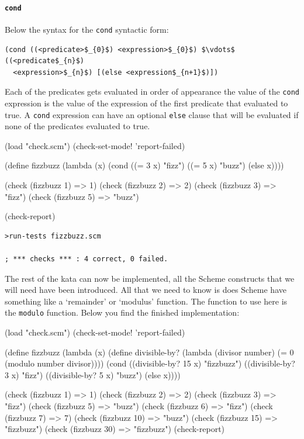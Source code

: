 \documentclass[12pt,a4paper,english,twoside]{article}
\begin{document}
\paragraph{\texttt{cond}}
Below the syntax for the \texttt{cond} syntactic form:
\begin{lstlisting}[mathescape]
  (cond ((<predicate>$_{0}$) <expression>$_{0}$) $\vdots$ ((<predicate$_{n}$) 
  <expression>$_{n}$) [(else <expression$_{n+1}$)])
\end{lstlisting}
Each of the predicates gets evaluated in order of appearance the value of the 
\texttt{cond} expression is the value of the expression of the first predicate 
that evaluated to true. A \texttt{cond} expression can have an optional 
\texttt{else} clause that will be evaluated if none of the predicates 
evaluated to true.
\begin{schemecode}
(load "check.scm")
(check-set-mode! 'report-failed)

(define fizzbuzz (lambda (x) (cond ((= 3 x) "fizz")
          ((= 5 x) "buzz")
          (else x))))

(check (fizzbuzz 1) => 1)
(check (fizzbuzz 2) => 2)
(check (fizzbuzz 3) => "fizz")
(check (fizzbuzz 5) => "buzz")

(check-report)
\end{schemecode}
\begin{lstlisting}
>run-tests fizzbuzz.scm

; *** checks *** : 4 correct, 0 failed.  \end{lstlisting}
The rest of the kata can now be implemented, all the Scheme constructs that we 
will need have been introduced. All that we need to know is does Scheme have 
something like a `remainder' or `modulus' function. The function to use here 
is the \texttt{modulo} function. Below you find the finished implementation:
\begin{schemecode}
(load "check.scm")
(check-set-mode! 'report-failed)

(define fizzbuzz (lambda (x) (define divisible-by?  (lambda (divisor number)
        (= 0 (modulo number divisor))))
    (cond ((divisible-by? 15 x) "fizzbuzz")
        ((divisible-by? 3 x) "fizz")
        ((divisible-by? 5 x) "buzz")
          (else x))))

(check (fizzbuzz 1) => 1)
(check (fizzbuzz 2) => 2)
(check (fizzbuzz 3) => "fizz")
(check (fizzbuzz 5) => "buzz")
(check (fizzbuzz 6) => "fizz")
(check (fizzbuzz 7) => 7)
(check (fizzbuzz 10) => "buzz")
(check (fizzbuzz 15) => "fizzbuzz")
(check (fizzbuzz 30) => "fizzbuzz")
(check-report)
\end{schemecode}
\end{document}
